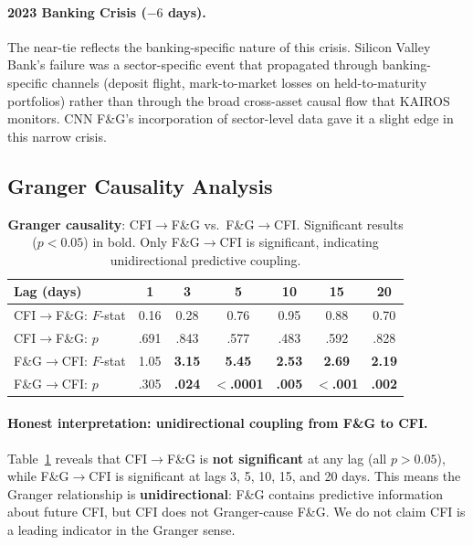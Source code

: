 \documentclass[11pt]{article}
\begin{document}
\paragraph{2023 Banking Crisis ($-6$ days).} The near-tie reflects the banking-specific nature of this crisis. Silicon Valley Bank's failure was a sector-specific event that propagated through banking-specific channels (deposit flight, mark-to-market losses on held-to-maturity portfolios) rather than through the broad cross-asset causal flow that KAIROS monitors. CNN F\&G's incorporation of sector-level data gave it a slight edge in this narrow crisis.

\subsection{Granger Causality Analysis}

\begin{table}[t]
\centering
\caption{\textbf{Granger causality}: CFI$\to$F\&G vs.\ F\&G$\to$CFI. Significant results ($p < 0.05$) in bold. Only F\&G$\to$CFI is significant, indicating unidirectional predictive coupling.}
\label{tab:granger}
\small
\begin{tabular}{lcccccc}
\toprule
\textbf{Lag (days)} & 1 & 3 & 5 & 10 & 15 & 20 \\
\midrule
CFI$\to$F\&G: $F$-stat & 0.16 & 0.28 & 0.76 & 0.95 & 0.88 & 0.70 \\
CFI$\to$F\&G: $p$      & .691 & .843 & .577 & .483 & .592 & .828 \\
\midrule
F\&G$\to$CFI: $F$-stat & 1.05 & \textbf{3.15} & \textbf{5.45} & \textbf{2.53} & \textbf{2.69} & \textbf{2.19} \\
F\&G$\to$CFI: $p$      & .305 & \textbf{.024} & \textbf{$<$.0001} & \textbf{.005} & \textbf{$<$.001} & \textbf{.002} \\
\bottomrule
\end{tabular}
\end{table}

\paragraph{Honest interpretation: unidirectional coupling from F\&G to CFI.} Table~\ref{tab:granger} reveals that CFI$\to$F\&G is \textbf{not significant} at any lag (all $p > 0.05$), while F\&G$\to$CFI is significant at lags 3, 5, 10, 15, and 20 days. This means the Granger relationship is \textbf{unidirectional}: F\&G contains predictive information about future CFI, but CFI does not Granger-cause F\&G. We do not claim CFI is a leading indicator in the Granger sense.
\end{document}
